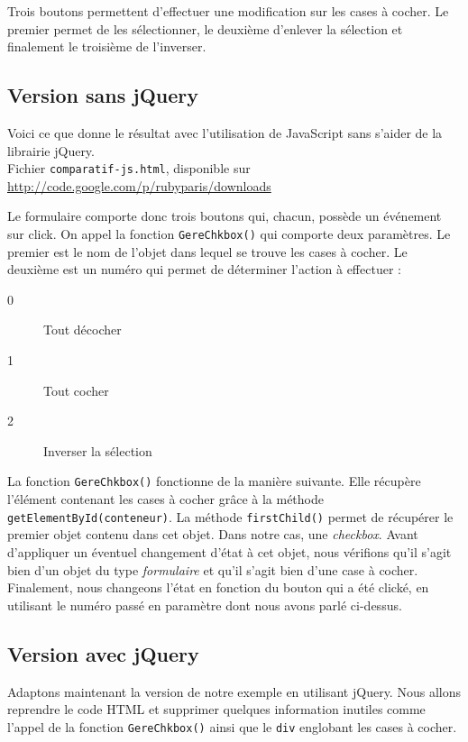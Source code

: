 \documentclass[10pt,a4paper,titlepage]{article}
\begin{document}
Trois boutons permettent d'effectuer une modification sur les cases à cocher. Le premier permet de les sélectionner, le deuxième d'enlever la sélection et finalement le troisième de l'inverser. \\

\subsection{Version sans jQuery}

Voici ce que donne le résultat avec l'utilisation de JavaScript sans s'aider de la librairie jQuery. \\

Fichier \texttt{comparatif-js.html}, disponible sur \url{http://code.google.com/p/rubyparis/downloads}



Le formulaire comporte donc trois boutons qui, chacun, possède un événement sur click. On appel la fonction \texttt{GereChkbox()} qui comporte deux paramètres. Le premier est le nom de l'objet dans lequel se trouve les cases à cocher. Le deuxième est un numéro qui permet de déterminer l'action à effectuer : 


\begin{description}
	\item[0] Tout décocher
	\item[1] Tout cocher
	\item[2] Inverser la sélection
\end{description}

La fonction \texttt{GereChkbox()} fonctionne de la manière suivante. Elle récupère l'élément contenant les cases à cocher grâce à la méthode \texttt{getElementById(conteneur)}. La méthode \texttt{firstChild()} permet de récupérer le premier objet contenu dans cet objet. Dans notre cas, une \emph{checkbox}. Avant d'appliquer un éventuel changement d'état à cet objet, nous vérifions qu'il s'agit bien d'un objet du type \emph{formulaire} et qu'il s'agit bien d'une case à cocher. Finalement, nous changeons l'état en fonction du bouton qui a été clické, en utilisant le numéro passé en paramètre dont nous avons parlé ci-dessus.

\subsection{Version avec jQuery}

Adaptons maintenant la version de notre exemple en utilisant jQuery. Nous allons reprendre le code HTML et supprimer quelques information inutiles comme l'appel de la fonction \texttt{GereChkbox()} ainsi que le \texttt{div} englobant les cases à cocher. \\
\end{document}
